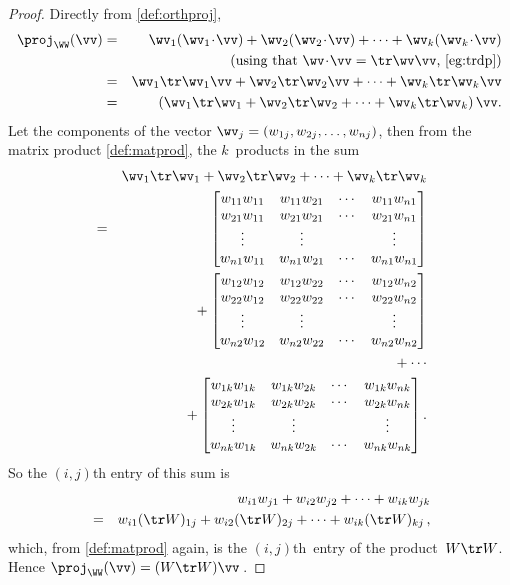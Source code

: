 \begin{proof} 
Directly from \autoref{def:orthproj},
\begin{eqnarray*}
\proj_\WW(\vv)&=&\wv_1(\wv_1\cdot\vv)+\wv_2(\wv_2\cdot\vv)+\cdots+\wv_k(\wv_k\cdot\vv)
\\&&(\text{using that \(\wv\cdot\vv=\tr\wv\vv\), \autoref{eg:trdp}})
\\&=&\wv_1\tr\wv_1\vv+\wv_2\tr\wv_2\vv+\cdots+\wv_k\tr\wv_k\vv
\\&=&\left(\wv_1\tr\wv_1+\wv_2\tr\wv_2+\cdots+\wv_k\tr\wv_k\right)\vv.
\end{eqnarray*}
Let the components of the vector \(\wv_j=(w_{1j},w_{2j},\ldots,w_{nj})\), then from the matrix product \autoref{def:matprod}, the \(k\)~products in the sum 
\def\ww#1{\begin{bmatrix} 
w_{1#1}w_{1#1}& w_{1#1}w_{2#1}&\cdots& w_{1#1}w_{n#1} \\
w_{2#1}w_{1#1}& w_{2#1}w_{2#1}&\cdots& w_{2#1}w_{n#1} \\
\vdots&\vdots&&\vdots\\
w_{n#1}w_{1#1}& w_{n#1}w_{2#1}&\cdots& w_{n#1}w_{n#1} 
\end{bmatrix}}
\begin{eqnarray*}
&&\wv_1\tr\wv_1+\wv_2\tr\wv_2+\cdots+\wv_k\tr\wv_k
\\&=& \ww1
\\&&{}+\ww2
\\&&{}+\cdots
\\&&{}+\ww k.
\end{eqnarray*}
So the \((i,j)\)th entry of this sum is
\begin{eqnarray*}
&&w_{i1}w_{j1}+w_{i2}w_{j2}+\cdots+w_{ik}w_{jk}
\\&=&w_{i1}(\tr W)_{1j}+w_{i2}(\tr W)_{2j}+\cdots+w_{ik}(\tr W)_{kj} \,,
\end{eqnarray*}
which, from \autoref{def:matprod} again, is the \((i,j)\)th~entry of the product~\(W\tr W\).
Hence \(\proj_\WW(\vv)=(W\tr W)\vv\)\,.
\end{proof}



